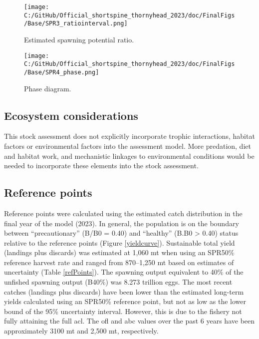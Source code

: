\documentclass[11pt,
  english,
  letterpaper,
]{article}
\begin{document}
\begin{figure}
\centering
\texttt{[image: C:/GitHub/Official\_shortspine\_thornyhead\_2023/doc/FinalFigs/Base/SPR3\_ratiointerval.png]}
\caption{Estimated spawning potential ratio.\label{fig:spr_trajectory}}
\end{figure}

\begin{figure}
\centering
\texttt{[image: C:/GitHub/Official\_shortspine\_thornyhead\_2023/doc/FinalFigs/Base/SPR4\_phase.png]}
\caption{Phase diagram.\label{fig:phase_diagram}}
\end{figure}

\hypertarget{ecosystem-considerations}{%
\subsection*{Ecosystem considerations}\label{ecosystem-considerations}}

This stock assessment does not explicitly incorporate trophic interactions, habitat factors or environmental factors into the assessment model. More predation, diet and habitat work, and mechanistic linkages to environmental conditions would be needed to incorporate these elements into the stock assessment.

\hypertarget{reference-points}{%
\subsection*{Reference points}\label{reference-points}}

Reference points were calculated using the estimated catch distribution in the final year of the model (2023). In general, the population is on the boundary between ``precautionary'' (B/B0 = 0.40) and ``healthy'' (B.B0 \textgreater{} 0.40) status relative to the reference points (Figure \ref{yieldcurve}). Sustainable total yield (landings plus discards) was estimated at 1,060 mt when using an SPR50\% reference harvest rate and ranged from 870--1,250 mt based on estimates of uncertainty (Table \ref{refPoints}). The spawning output equivalent to 40\% of the unfished spawning output (B40\%) was 8.273 trillion eggs. The most recent catches (landings plus discards) have been lower than the estimated long-term yields calculated using an SPR50\% reference point, but not as low as the lower bound of the 95\% uncertainty interval. However, this is due to the fishery not fully attaining the full \gls{acl}. The \gls{ofl} and \gls{abc} values over the past 6 years have been approximately 3100 mt and 2,500 mt, respectively.
\end{document}
